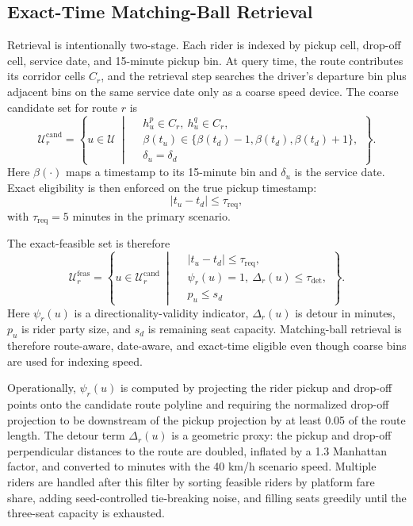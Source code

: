 \documentclass[journal]{IEEEtran}
\begin{document}
\subsection{Exact-Time Matching-Ball Retrieval}
Retrieval is intentionally two-stage. Each rider is indexed by pickup cell, drop-off cell, service date, and 15-minute pickup bin. At query time, the route contributes its corridor cells \(C_r\), and the retrieval step searches the driver's departure bin plus adjacent bins on the same service date only as a coarse speed device. The coarse candidate set for route \(r\) is
\begingroup
\small
\begin{equation}
\mathcal{U}_r^{\mathrm{cand}}=
\left\{
u\in\mathcal{U}\ \middle|\
\begin{aligned}
&h_u^{p}\in C_r,\ h_u^{q}\in C_r,\\
&\beta(t_u)\in\{\beta(t_d)-1,\beta(t_d),\beta(t_d)+1\},\\
&\delta_u=\delta_d
\end{aligned}
\right\}.
\end{equation}
\endgroup
Here \(\beta(\cdot)\) maps a timestamp to its 15-minute bin and \(\delta_u\) is the service date. Exact eligibility is then enforced on the true pickup timestamp:
\[
|t_u - t_d| \le \tau_{\mathrm{req}},
\]
with \(\tau_{\mathrm{req}}=5\) minutes in the primary scenario.

The exact-feasible set is therefore
\begingroup
\small
\begin{equation}
\mathcal{U}_r^{\mathrm{feas}}=
\left\{
u\in\mathcal{U}_r^{\mathrm{cand}}\ \middle|\
\begin{aligned}
&|t_u-t_d|\le\tau_{\mathrm{req}},\\
&\psi_r(u)=1,\ \Delta_r(u)\le\tau_{\mathrm{det}},\\
&p_u\le s_d
\end{aligned}
\right\}.
\end{equation}
\endgroup
Here \(\psi_r(u)\) is a directionality-validity indicator, \(\Delta_r(u)\) is detour in minutes, \(p_u\) is rider party size, and \(s_d\) is remaining seat capacity. Matching-ball retrieval is therefore route-aware, date-aware, and exact-time eligible even though coarse bins are used for indexing speed.

Operationally, \(\psi_r(u)\) is computed by projecting the rider pickup and drop-off points onto the candidate route polyline and requiring the normalized drop-off projection to be downstream of the pickup projection by at least 0.05 of the route length. The detour term \(\Delta_r(u)\) is a geometric proxy: the pickup and drop-off perpendicular distances to the route are doubled, inflated by a 1.3 Manhattan factor, and converted to minutes with the 40 km/h scenario speed. Multiple riders are handled after this filter by sorting feasible riders by platform fare share, adding seed-controlled tie-breaking noise, and filling seats greedily until the three-seat capacity is exhausted.
\end{document}
